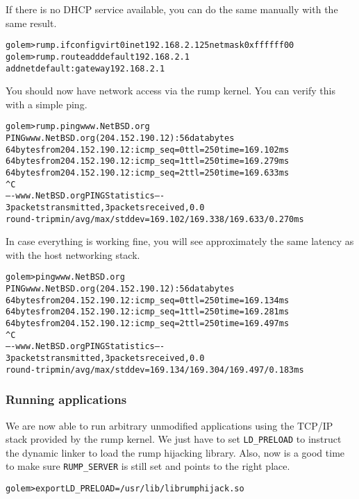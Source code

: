 If there is no DHCP service available, you can do the same
manually with the same result.

{\footnotesize
\begin{alltt}
golem> rump.ifconfig virt0 inet 192.168.2.125 netmask 0xffffff00
golem> rump.route add default 192.168.2.1
add net default: gateway 192.168.2.1
\end{alltt}}

You should now have network access via the rump kernel.  You can
verify this with a simple ping.

{\footnotesize
\begin{alltt}
golem> rump.ping www.NetBSD.org
PING www.NetBSD.org (204.152.190.12): 56 data bytes
64 bytes from 204.152.190.12: icmp_seq=0 ttl=250 time=169.102 ms
64 bytes from 204.152.190.12: icmp_seq=1 ttl=250 time=169.279 ms
64 bytes from 204.152.190.12: icmp_seq=2 ttl=250 time=169.633 ms
^C
----www.NetBSD.org PING Statistics----
3 packets transmitted, 3 packets received, 0.0% packet loss
round-trip min/avg/max/stddev = 169.102/169.338/169.633/0.270 ms
\end{alltt}}

In case everything is working fine, you will see approximately the
same latency as with the host networking stack.

{\footnotesize
\begin{alltt}
golem> ping www.NetBSD.org
PING www.NetBSD.org (204.152.190.12): 56 data bytes
64 bytes from 204.152.190.12: icmp_seq=0 ttl=250 time=169.134 ms
64 bytes from 204.152.190.12: icmp_seq=1 ttl=250 time=169.281 ms
64 bytes from 204.152.190.12: icmp_seq=2 ttl=250 time=169.497 ms
^C
----www.NetBSD.org PING Statistics----
3 packets transmitted, 3 packets received, 0.0% packet loss
round-trip min/avg/max/stddev = 169.134/169.304/169.497/0.183 ms
\end{alltt}}

\subsubsection{Running applications}

We are now able to run arbitrary unmodified applications using the
TCP/IP stack provided by the rump kernel.  We just have to set
\verb+LD_PRELOAD+ to instruct the dynamic linker to load
the rump hijacking library.  Also, now is a good time to make sure
\verb+RUMP_SERVER+ is still set and points to the right
place.

{\footnotesize
\begin{alltt}
golem> export LD_PRELOAD=/usr/lib/librumphijack.so
\end{alltt}}

